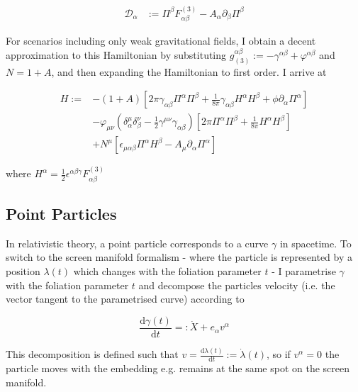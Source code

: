 \documentclass[11pt]{article}
\begin{document}
\begin{align}
	\mathcal{D}_{\alpha} &:= \Pi^{\beta} F^{(3)}_{\alpha \beta} -  A_{\alpha} 
	\partial_{\beta} \Pi^{\beta}
\end{align}


For scenarios including only weak gravitational fields, I obtain a decent approximation to this Hamiltonian by substituting  $g_{(3)}^{\alpha \beta}  := - \gamma^{\alpha \beta} + \varphi^{\alpha \beta}$  and  $ N = 1 + A $, and then expanding the Hamiltonian to first order. I arrive at

\begin{equation}
\begin{split}
	H :=  
	& - \left( 1 + A \right) 
	\left[
	2 \pi \gamma_{\alpha \beta} \Pi^{\alpha} \Pi^{\beta}
	 + \frac{1}{8 \pi} \gamma_{\alpha \beta} H^{\alpha} H^{\beta}
	 + \phi \partial_{\alpha} \Pi^{\alpha}
	 \right]\\
	 & -  \varphi_{\mu \nu} 
	 \left( \delta_{\alpha}^{\mu}  \delta_{\beta}^{\nu} -  \frac{1}{2} \gamma^{\mu \nu } \gamma_{\alpha \beta} \right)
	 \left[
	 2 \pi  \Pi^{\alpha} \Pi^{\beta}
	 + \frac{1}{8 \pi} H^{\alpha} H^{\beta}
	 \right] \\
	 & + N^{\mu} \left[ 
	 \epsilon_{\mu \alpha \beta} \Pi^{\alpha} H^{\beta} -  A_{\mu} \partial_\alpha \Pi^\alpha
	 \right]
\end{split}
\end{equation}


where $H^\alpha = \frac{1}{2}\epsilon^{\alpha \beta \gamma} F^{(3)}_{\alpha \beta} $

\subsection{Point Particles}

In relativistic theory, a point particle corresponds to a curve $\gamma$ in spacetime. To switch to the screen manifold formalism - where the particle is represented by a position $\lambda (t) $ which changes with the foliation parameter $t$ - I parametrise $\gamma$ with the foliation parameter $t$ and decompose the particles velocity (i.e. the vector tangent to the parametrised curve) according to

\begin{equation}
	\frac{\mathrm{d} \gamma (t)}{\mathrm{d} t } =: \dot{X} +  e_\alpha v^\alpha
\end{equation}

This decomposition is defined such that $v = 	\frac{\mathrm{d} \lambda (t)}{\mathrm{d} t } := \dot{\lambda} (t) $, so if $ v^\alpha = 0 $ the particle  moves with the embedding e.g. remains at the same spot on the screen manifold.
\end{document}
